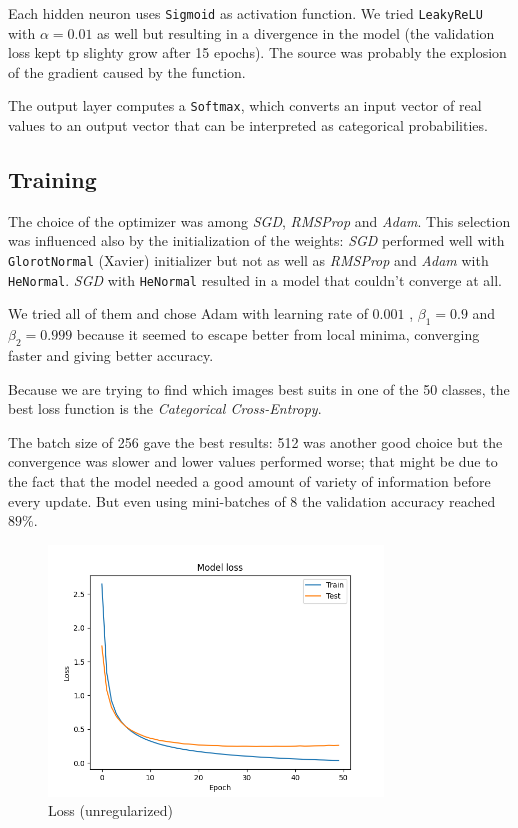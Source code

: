 \documentclass[compsoc]{IEEEtran}
\begin{document}
Each hidden neuron uses \texttt{Sigmoid} as activation function. We tried \texttt{LeakyReLU} with $\alpha=0.01$ as well but resulting in a divergence in the model (the validation loss kept tp slighty grow after 15 epochs). The source was probably the explosion of the gradient caused by the function.  \par 
The output layer computes a \texttt{Softmax}, which converts an input vector of real values to an output vector that can be interpreted as categorical probabilities.

\subsection{Training}
The choice of the optimizer was among \emph{SGD}, \emph{RMSProp} and
\emph{Adam}. This selection was influenced also by the initialization of the weights: 
\emph{SGD} performed well with \texttt{GlorotNormal} (Xavier) initializer but not as well as \emph{RMSProp} and
\emph{Adam} with \texttt{HeNormal}. \emph{SGD} with \texttt{HeNormal} resulted in a model that couldn't converge at all.

We tried all of them and chose Adam with learning
rate of $0.001$ , $\beta_1 = 0.9$ and $\beta_2 = 0.999$ because it seemed to
escape better from local minima, converging faster and giving
better accuracy. \par 
Because we are trying to find which images best suits in one of the 50 classes, the best loss function is the \emph{Categorical Cross-Entropy}.\par
The batch size of 256 gave the best results: 512 was another good choice but the convergence was slower and lower values performed worse; that might be
due to the fact that the model needed a good amount of variety of information before every update. But even using mini-batches of 8 the validation accuracy
reached $89\%$.




\begin{figure}[ht!]
\centering                                                                        
\includegraphics[width=3.5in]{../images/noreg/loss-sigmoid-categorical_crossentropy-Adam-50-256.png}
\captionsetup{justification=centering}                                                                                                                                   
\caption{Loss (unregularized)}
\label{fig:loss1}                                                                                                                                                           
\end{figure}
\end{document}
